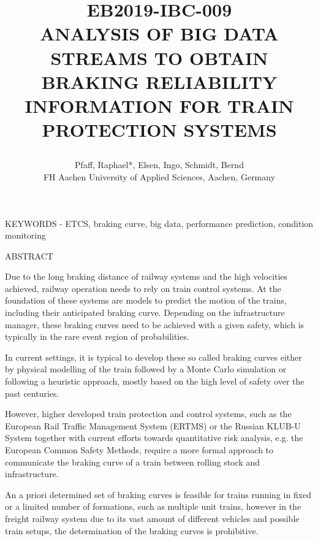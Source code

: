 \documentclass[a4paper, 12pt]{scrartcl}
\begin{document}
\setlength{\parindent}{0ex}
\title{\vspace{-2cm}
	\begin{flushleft}
	{\normalsize\textbf{EB2019-IBC-009}
	}\\ \vspace{.5cm}
	\large \uppercase{Analysis of Big Data Streams to obtain Braking Reliability Information for Train Protection systems}
	\end{flushleft}
	}

\author{\normalsize	
	Pfaff, Raphael*, Elsen, Ingo, Schmidt, Bernd \\ \normalsize	
	FH Aachen University of Applied Sciences, Aachen, Germany %
	}
\date{}
\maketitle


KEYWORDS - ETCS, braking curve, big data, performance prediction, condition monitoring
\vspace{.2cm}

ABSTRACT 

Due to the long braking distance of railway systems and the high velocities achieved, railway operation needs to rely on train control systems. At the foundation of these systems are models to predict the motion of the trains, including their anticipated braking curve. Depending on the infrastructure manager, these braking curves need to be achieved with a given safety, which is typically in the rare event region of probabilities.

In current settings, it is typical to develop these so called braking curves either by physical modelling of the train followed by a Monte Carlo simulation or following a heuristic approach, mostly based on the high level of safety over the past centuries.

However, higher developed train protection and control systems, such as the European Rail Traffic Management System (ERTMS) or the Russian KLUB-U System together with current efforts towards quantitative risk analysis, e.g. the European Common Safety Methods, require a more formal approach to communicate the braking curve of a train between rolling stock and infrastructure.

An a priori determined set of braking curves is feasible for trains running in fixed or a limited number of formations, such as multiple unit trains, however in the freight railway system due to its vast amount of different vehicles and possible train setups, the determination of the braking curves is prohibitive.
\end{document}

